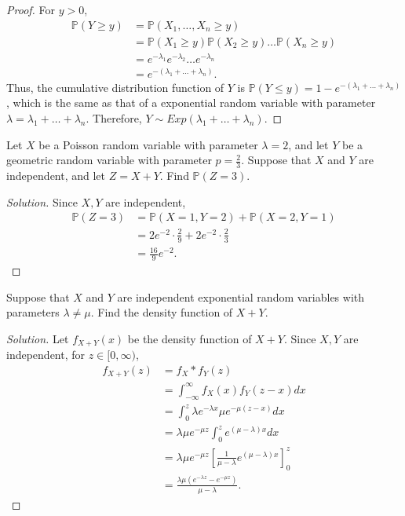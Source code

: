 \documentclass[addpoints, 11pt]{exam}
\newcommand*{\prob}{\mathds{P}}
\newenvironment{question}[1]{\smallskip\noindent\color{crimson}{\bf Question #1.}}{}
\begin{document}
\begin{proof}
    For $y > 0$,
    \begin{align*}
        \prob(Y \geq y)
        &= \prob(X_1, \dots , X_n \geq y) \\
        &= \prob(X_1 \geq y)\prob(X_2 \geq y) \dots \prob(X_n \geq y) \\
        &= e^{-\lambda_1}e^{-\lambda_2} \dots e^{-\lambda_n} \\
        &= e^{-(\lambda_1 + \dots + \lambda_n)}.
    \end{align*}
     Thus, the cumulative distribution function of $Y$ is $\prob(Y \leq y) = 1 - e^{-(\lambda_1 + \dots + \lambda_n)}$, which is the same as that of a exponential random variable with parameter $\lambda = \lambda_1 + \dots + \lambda_n$. Therefore, $Y \sim Exp(\lambda_1 + \dots + \lambda_n)$.
\end{proof}

\newpage

\begin{question}{6}
    Let $X$ be a Poisson random variable with parameter $\lambda = 2$, and let $Y$ be a geometric random variable with parameter $p = \frac{2}{3}$. Suppose that $X$ and $Y$ are independent, and let $Z = X+Y$. Find $\prob(Z = 3)$.
\end{question}

\begin{proof}[Solution]
    Since $X,Y$ are independent,
    \begin{align*}
        \prob(Z = 3)
        &= \prob(X = 1, Y = 2) + \prob(X = 2, Y = 1) \\
        &= 2e^{-2} \cdot \frac{2}{9} + 2e^{-2} \cdot \frac{2}{3} \\
        &= \frac{16}{9}e^{-2}.
    \end{align*}
\end{proof}

\newpage

\begin{question}{7}
    Suppose that $X$ and $Y$ are independent exponential random variables with parameters $\lambda \neq \mu$. Find the density function of $X + Y$.
\end{question}

\begin{proof}[Solution]
    Let $f_{X+Y}(x)$ be the density function of $X + Y$. Since $X, Y$ are independent, for $z \in [0, \infty)$,
    \begin{align*}
        f_{X+Y}(z)
        &= f_X \ast f_Y(z) \\
        &= \int^{\infty}_{-\infty} f_X(x)f_Y(z - x) dx \\
        &= \int^{z}_{0} \lambda e^{-\lambda x} \mu e^{-\mu (z - x)} dx \\
        &= \lambda \mu e^{-\mu z}\int^{z}_{0}  e^{(\mu - \lambda)x} dx \\
        &= \lambda \mu e^{-\mu z}\left[\frac{1}{\mu - \lambda}e^{(\mu - \lambda)x}\right]^{z}_0 \\
        &= \frac{\lambda \mu (e^{-\lambda z} - e^{-\mu z})}{\mu - \lambda}.
    \end{align*}
\end{proof}
\end{document}
